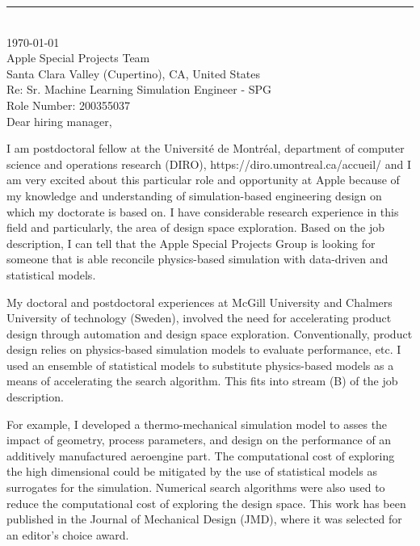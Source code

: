 \documentclass[12pt]{article} %
\begin{document}
\medskip %
\rule[0pt]{\textwidth}{1pt}\\
\today\\[6pt]


Apple Special Projects Team\\
Santa Clara Valley (Cupertino), CA, United States\\
Re: Sr. Machine Learning Simulation Engineer - SPG\\
Role Number: 200355037\\[6pt] \medskip
Dear hiring manager,

\medskip %

I am postdoctoral fellow at the Université de Montréal, department of computer science and operations research (DIRO), https://diro.umontreal.ca/accueil/ and I am very excited about this particular role and opportunity at Apple because of my  knowledge and understanding of simulation-based engineering design on which my doctorate is based on. I have considerable research experience in this field and particularly, the area of design space exploration. Based on the job description, I can tell that the Apple Special Projects Group is looking for someone that is able reconcile physics-based simulation with data-driven and statistical models.

\medskip %

My doctoral and postdoctoral experiences at McGill University and Chalmers University of technology (Sweden), involved the need for accelerating product design through automation and design space exploration. Conventionally, product design relies on physics-based simulation models to evaluate performance, etc. I used an ensemble of statistical models to substitute physics-based models as a means of accelerating the search algorithm. This fits into stream (B) of the job description.

\medskip %

For example, I developed a thermo-mechanical simulation model to asses the impact of geometry, process parameters, and design on the performance of an additively manufactured aeroengine part. The computational cost of exploring the high dimensional could be mitigated by the use of statistical models as surrogates for the simulation. Numerical search algorithms were also used to reduce the computational cost of exploring the design space. This work has been published in the Journal of Mechanical Design (JMD), where it was selected for an editor's choice award. 
\end{document}
